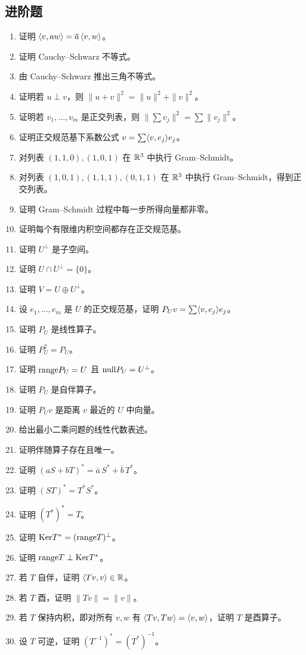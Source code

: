 \subsection*{进阶题}
\begin{enumerate}[resume, label=\textbf{\arabic*.}, leftmargin=*, itemsep=0.5em]
\item \medium 证明 $\langle v, aw \rangle=\overline a\,\langle v, w \rangle$。
\item \medium 证明 Cauchy--Schwarz 不等式。
\item \medium 由 Cauchy--Schwarz 推出三角不等式。
\item \medium 证明若 $u\perp v$，则 $\|u+v\|^2=\|u\|^2+\|v\|^2$。
\item \medium 证明若 $v_1,\dots,v_m$ 是正交列表，则 $\|\sum v_j\|^2=\sum\|v_j\|^2$。
\item \medium 证明正交规范基下系数公式 $v=\sum \langle v, e_j \rangle e_j$。
\item \medium 对列表 $(1,1,0),(1,0,1)$ 在 $\mathbb{R}^3$ 中执行 Gram--Schmidt。
\item \medium 对列表 $(1,0,1),(1,1,1),(0,1,1)$ 在 $\mathbb{R}^3$ 中执行 Gram--Schmidt，得到正交列表。
\item \medium 证明 Gram--Schmidt 过程中每一步所得向量都非零。
\item \medium 证明每个有限维内积空间都存在正交规范基。
\item \medium 证明 $U^{\perp}$ 是子空间。
\item \medium 证明 $U\cap U^{\perp}=\{0\}$。
\item \medium 证明 $V=U\oplus U^{\perp}$。
\item \medium 设 $e_1,\dots,e_m$ 是 $U$ 的正交规范基，证明 $P_Uv=\sum\langle v, e_j \rangle e_j$。
\item \medium 证明 $P_U$ 是线性算子。
\item \medium 证明 $P_U^2=P_U$。
\item \medium 证明 $\mathrm{range} P_U=U$ 且 $\mathrm{null} P_U=U^{\perp}$。
\item \medium 证明 $P_U$ 是自伴算子。
\item \medium 证明 $P_Uv$ 是距离 $v$ 最近的 $U$ 中向量。
\item \medium 给出最小二乘问题的线性代数表述。
\item \medium 证明伴随算子存在且唯一。
\item \medium 证明 $(aS+bT)^*=\overline a\,S^*+\overline b\,T^*$。
\item \medium 证明 $(ST)^*=T^*S^*$。
\item \medium 证明 $(T^*)^*=T$。
\item \medium 证明 $\mathrm{Ker} T^*=(\mathrm{range} T)^{\perp}$。
\item \medium 证明 $\mathrm{range} T\perp \mathrm{Ker} T^*$。
\item \medium 若 $T$ 自伴，证明 $\langle Tv, v \rangle\in\mathbb{R}$。
\item \medium 若 $T$ 酉，证明 $\|Tv\|=\|v\|$。
\item \medium 若 $T$ 保持内积，即对所有 $v,w$ 有 $\langle Tv, Tw \rangle=\langle v, w \rangle$，证明 $T$ 是酉算子。
\item \medium 设 $T$ 可逆，证明 $(T^{-1})^*=(T^*)^{-1}$。
\end{enumerate}

